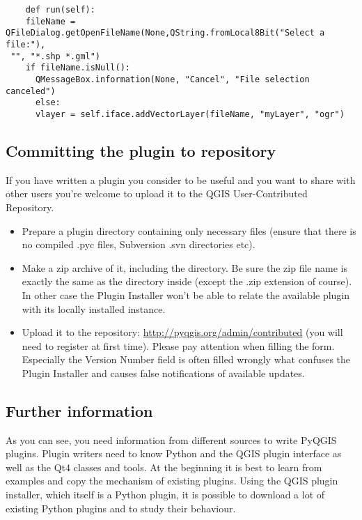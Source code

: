 \begin{verbatim}
    def run(self):
    fileName = QFileDialog.getOpenFileName(None,QString.fromLocal8Bit("Select a file:"),
 "", "*.shp *.gml")
    if fileName.isNull():
      QMessageBox.information(None, "Cancel", "File selection canceled")
      else:
      vlayer = self.iface.addVectorLayer(fileName, "myLayer", "ogr")
\end{verbatim}


\subsection{Committing the plugin to repository}

If you have written a plugin you consider to be useful and you want to share with
other users you're welcome to upload it to the QGIS User-Contributed Repository.
\begin{itemize}
\item Prepare a plugin directory containing only necessary files (ensure that there
is no compiled .pyc files, Subversion .svn directories etc).
\item Make a zip archive of it, including the directory. Be sure the zip file
name is exactly the same as the directory inside (except the .zip extension of course).
In other case the Plugin Installer won't be able to relate the available plugin with its
locally installed instance.
\item Upload it to the repository: \url{http://pyqgis.org/admin/contributed} (you
will need to register at first time). Please pay attention when filling the form.
Especially the Version Number field is often filled wrongly what confuses the Plugin
Installer and causes false notifications of available updates.
\end{itemize}

\subsection{Further information}

As you can see, you need information from different sources to write PyQGIS
plugins. Plugin writers need to know Python and the QGIS plugin interface as
well as the Qt4 classes and tools. At the beginning it is best to learn from
examples and copy the mechanism of existing plugins. Using the QGIS plugin
installer, which itself is a Python plugin, it is possible to download a lot
of existing Python plugins and to study their behaviour.


